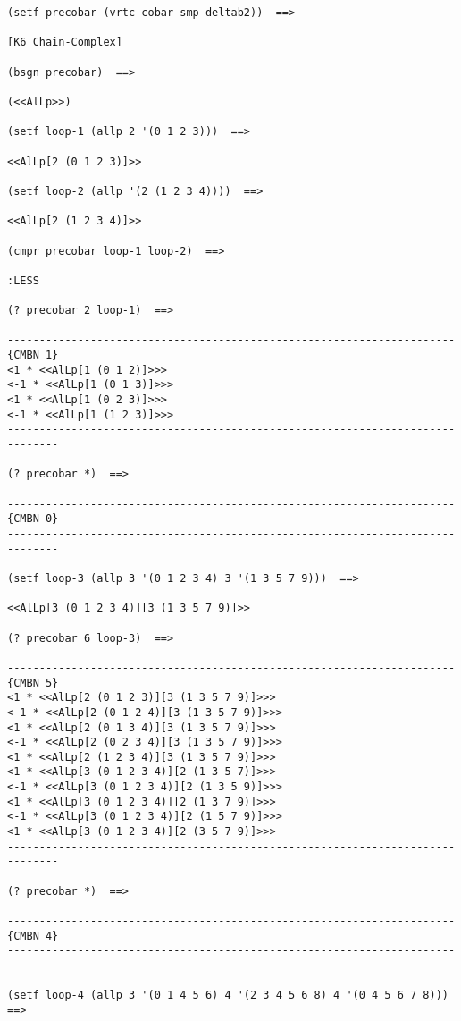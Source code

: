 {\footnotesize\begin{verbatim}
(setf precobar (vrtc-cobar smp-deltab2))  ==>

[K6 Chain-Complex]

(bsgn precobar)  ==>

(<<AlLp>>)

(setf loop-1 (allp 2 '(0 1 2 3)))  ==>

<<AlLp[2 (0 1 2 3)]>>

(setf loop-2 (allp '(2 (1 2 3 4))))  ==>

<<AlLp[2 (1 2 3 4)]>>

(cmpr precobar loop-1 loop-2)  ==>

:LESS

(? precobar 2 loop-1)  ==>

----------------------------------------------------------------------{CMBN 1}
<1 * <<AlLp[1 (0 1 2)]>>>
<-1 * <<AlLp[1 (0 1 3)]>>>
<1 * <<AlLp[1 (0 2 3)]>>>
<-1 * <<AlLp[1 (1 2 3)]>>>
------------------------------------------------------------------------------

(? precobar *)  ==>

----------------------------------------------------------------------{CMBN 0}
------------------------------------------------------------------------------

(setf loop-3 (allp 3 '(0 1 2 3 4) 3 '(1 3 5 7 9)))  ==>

<<AlLp[3 (0 1 2 3 4)][3 (1 3 5 7 9)]>>

(? precobar 6 loop-3)  ==>

----------------------------------------------------------------------{CMBN 5}
<1 * <<AlLp[2 (0 1 2 3)][3 (1 3 5 7 9)]>>>
<-1 * <<AlLp[2 (0 1 2 4)][3 (1 3 5 7 9)]>>>
<1 * <<AlLp[2 (0 1 3 4)][3 (1 3 5 7 9)]>>>
<-1 * <<AlLp[2 (0 2 3 4)][3 (1 3 5 7 9)]>>>
<1 * <<AlLp[2 (1 2 3 4)][3 (1 3 5 7 9)]>>>
<1 * <<AlLp[3 (0 1 2 3 4)][2 (1 3 5 7)]>>>
<-1 * <<AlLp[3 (0 1 2 3 4)][2 (1 3 5 9)]>>>
<1 * <<AlLp[3 (0 1 2 3 4)][2 (1 3 7 9)]>>>
<-1 * <<AlLp[3 (0 1 2 3 4)][2 (1 5 7 9)]>>>
<1 * <<AlLp[3 (0 1 2 3 4)][2 (3 5 7 9)]>>>
------------------------------------------------------------------------------

(? precobar *)  ==>

----------------------------------------------------------------------{CMBN 4}
------------------------------------------------------------------------------

(setf loop-4 (allp 3 '(0 1 4 5 6) 4 '(2 3 4 5 6 8) 4 '(0 4 5 6 7 8)))  ==>


\end{verbatim}}
